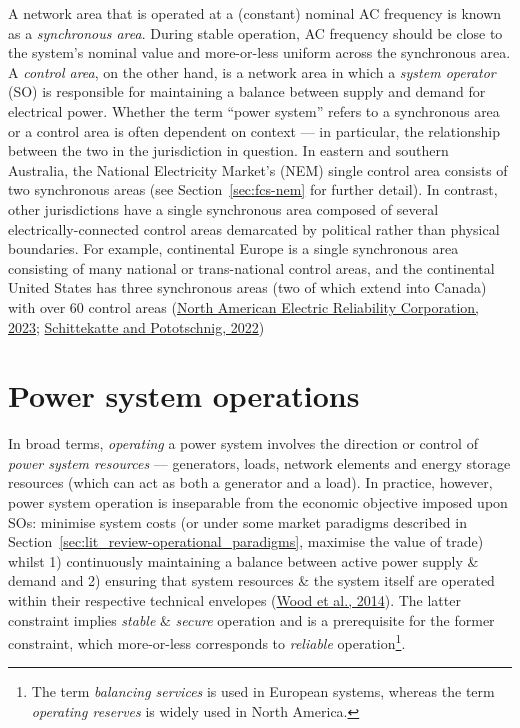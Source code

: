 \documentclass[12pt,a4paper,]{report}
\begin{document}
A network area that is operated at a (constant) nominal AC frequency is
known as a \emph{synchronous area}. During stable operation, AC
frequency should be close to the system's nominal value and more-or-less
uniform across the synchronous area. A \emph{control area}, on the other
hand, is a network area in which a \emph{system operator} (SO) is
responsible for maintaining a balance between supply and demand for
electrical power. Whether the term ``power system'' refers to a
synchronous area or a control area is often dependent on context --- in
particular, the relationship between the two in the jurisdiction in
question. In eastern and southern Australia, the National Electricity
Market's (NEM) single control area consists of two synchronous areas
(see Section~\ref{sec:fcs-nem} for further detail). In contrast, other
jurisdictions have a single synchronous area composed of several
electrically-connected control areas demarcated by political rather than
physical boundaries. For example, continental Europe is a single
synchronous area consisting of many national or trans-national control
areas, and the continental United States has three synchronous areas
(two of which extend into Canada) with over 60 control areas
(\protect\hyperlink{ref-northamericanelectricreliabilitycorporationNERCInterconnections2023}{North
American Electric Reliability Corporation, 2023};
\protect\hyperlink{ref-schittekatteDistributedEnergyResources2022}{Schittekatte
and Pototschnig, 2022})

\hypertarget{power-system-operations}{%
\section{Power system operations}\label{power-system-operations}}

In broad terms, \emph{operating} a power system involves the direction
or control of \emph{power system resources} --- generators, loads,
network elements and energy storage resources (which can act as both a
generator and a load). In practice, however, power system operation is
inseparable from the economic objective imposed upon SOs: minimise
system costs (or under some market paradigms described in
Section~\ref{sec:lit_review-operational_paradigms}, maximise the value
of trade) whilst 1) continuously maintaining a balance between active
power supply \& demand and 2) ensuring that system resources \& the
system itself are operated within their respective technical envelopes
(\protect\hyperlink{ref-woodPowerGenerationOperation2014}{Wood et al.,
2014}). The latter constraint implies \emph{stable} \& \emph{secure}
operation and is a prerequisite for the former constraint, which
more-or-less corresponds to \emph{reliable} operation\footnote{The term
  \emph{balancing services} is used in European systems, whereas the
  term \emph{operating reserves} is widely used in North America.}.
\end{document}
